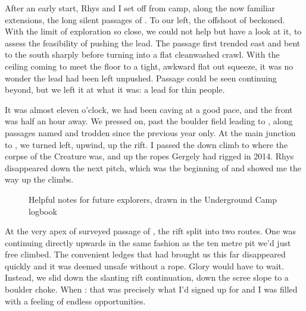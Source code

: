 After an early start, Rhys and I set off from camp, along the now familiar  extensions, the long silent passages of . To our left, the offshoot of  beckoned. With the limit of exploration so close, we could not help but have a look at it, to assess the feasibility of pushing the lead. The passage first trended east and bent to the south sharply before turning into a flat cleanwashed crawl. With the ceiling coming to meet the floor to a tight, awkward flat out squeeze, it was no wonder the lead had been left unpushed. Passage could be seen continuing beyond, but we left it at what it was: a lead for thin people.

It was almost eleven o'clock, we had been caving at a good pace, and the front was half an hour away. We pressed on, past the boulder field leading to , along passages named and trodden since the previous year only. At the main junction to , we turned left, upwind, up the rift. I passed the down climb to  where the corpse of the Creature was, and up the ropes Gergely had rigged in 2014. Rhys disappeared down the next pitch, which was the beginning of  and showed me the way up the climbs.

\begin{figure}[t!]
\checkoddpage \ifoddpage \forcerectofloat \else \forceversofloat \fi
\centering
{}
\caption{Helpful notes for future \protect{} explorers, drawn in the Underground Camp logbook }
\label{Notebook}
\end{figure}

At the very apex of surveyed passage of , the rift split into two routes. One was continuing directly upwards in the same fashion as the ten metre pit we'd just free climbed. The convenient ledges that had brought us this far disappeared quickly and it was deemed unsafe without a rope. Glory would have to wait. Instead, we slid down the slanting rift continuation, down the scree slope to a boulder choke. When : that was precisely what I'd signed up for and I was filled with a feeling of endless opportunities.

